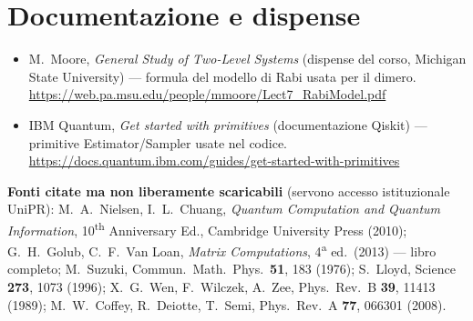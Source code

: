 \documentclass[11pt,a4paper]{article}
\begin{document}
\section{Documentazione e dispense}

\begin{itemize}[leftmargin=1.3em]
\item M.\ Moore, \emph{General Study of Two-Level Systems} (dispense del corso, Michigan State University) — formula del modello di Rabi usata per il dimero.\\
\url{https://web.pa.msu.edu/people/mmoore/Lect7_RabiModel.pdf}

\item IBM Quantum, \emph{Get started with primitives} (documentazione Qiskit) — primitive Estimator/Sampler usate nel codice.\\
\url{https://docs.quantum.ibm.com/guides/get-started-with-primitives}
\end{itemize}

\bigskip
\noindent\textbf{Fonti citate ma non liberamente scaricabili} (servono accesso istituzionale UniPR): M.\ A.\ Nielsen, I.\ L.\ Chuang, \emph{Quantum Computation and Quantum Information}, 10\textsuperscript{th} Anniversary Ed., Cambridge University Press (2010); G.\ H.\ Golub, C.\ F.\ Van Loan, \emph{Matrix Computations}, 4\textsuperscript{a} ed.\ (2013) — libro completo; M.\ Suzuki, Commun.\ Math.\ Phys.\ \textbf{51}, 183 (1976); S.\ Lloyd, Science \textbf{273}, 1073 (1996); X.\ G.\ Wen, F.\ Wilczek, A.\ Zee, Phys.\ Rev.\ B \textbf{39}, 11413 (1989); M.\ W.\ Coffey, R.\ Deiotte, T.\ Semi, Phys.\ Rev.\ A \textbf{77}, 066301 (2008).
\end{document}

